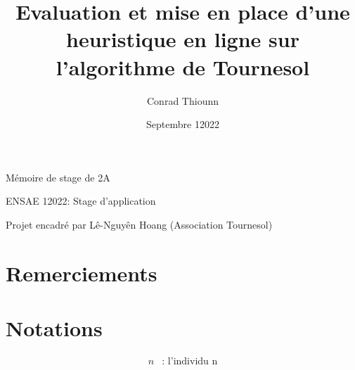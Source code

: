 \documentclass[hidelinks, 12pt]{article}
\title{Evaluation et mise en place d'une heuristique en ligne sur l'algorithme de Tournesol }
\author{
Conrad Thiounn }
\date{Septembre 12022}
\begin{document}
\begin{titlingpage}
\maketitle
\begin{center}
Mémoire de stage de 2A

ENSAE 12022: Stage d'application

\vspace{5mm}

Projet encadré par Lê-Nguyên Hoang (Association Tournesol)
\end{center}
\end{titlingpage}


\renewcommand*\contentsname{Table des matières}
\tableofcontents

\setlength\parskip{0.2 em} %

\pagebreak
{} %
\section*{Remerciements} 


\pagebreak

\printglossary[title=Glossaire et abréviations]

\clearpage

\pagebreak
{}
{}
\section*{Notations}

\newcommand{\si}{s_{\mathrm{image}}}
\newcommand{\li}{l_{\mathrm{image}}}

$$
\begin{aligned}
n & \text{: l'individu n} \\
\end{aligned}
$$

\pagebreak






\end{document}
